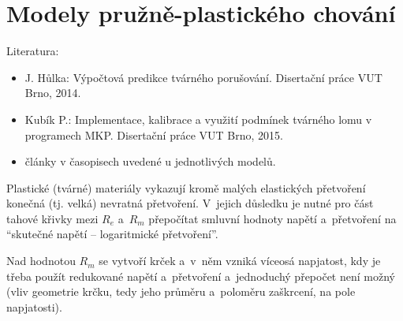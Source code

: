 
\section{Modely pružně-plastického chování}

Literatura:
\begin{itemize}
	\item J. Hůlka: Výpočtová predikce tvárného porušování. Disertační práce VUT Brno, 2014.
	\item Kubík P.: Implementace, kalibrace a využití podmínek tvárného lomu v programech MKP. Disertační práce VUT Brno, 2015.
	\item články v časopisech uvedené u jednotlivých modelů.
\end{itemize}

Plastické (tvárné) materiály vykazují kromě malých elastických přetvoření konečná (tj. velká) nevratná přetvoření. V~jejich důsledku je nutné pro část tahové křivky mezi $R_e$ a~$R_m$ přepočítat smluvní hodnoty napětí a~přetvoření na \enquote{skutečné napětí -- logaritmické přetvoření}.

Nad hodnotou $R_m$ se vytvoří krček a~v~něm vzniká víceosá napjatost, kdy je třeba použít redukované napětí a~přetvoření a~jednoduchý přepočet není možný (vliv geometrie krčku, tedy jeho průměru a~poloměru zaškrcení, na pole napjatosti).

